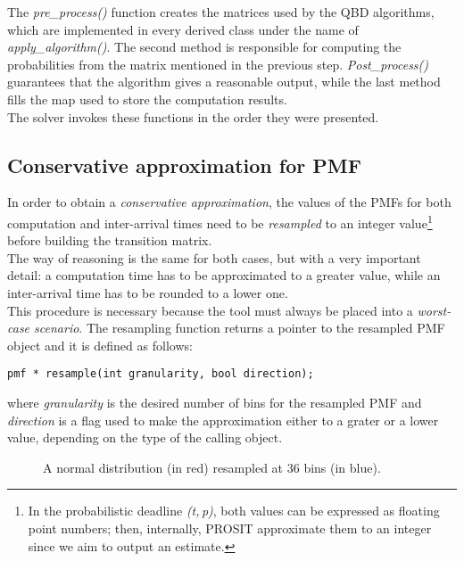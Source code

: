 The \emph{pre\_process()} function creates the matrices used by the QBD algorithms, which are implemented in every derived class under the name of \emph{apply\_algorithm()}. The second method is responsible for computing the probabilities from the matrix mentioned in the previous step. \emph{Post\_process()} guarantees that the algorithm gives a reasonable output, while the last method fills the map used to store the computation results.\\
The solver invokes these functions in the order they were presented.

\subsection{Conservative approximation for PMF}
In order to obtain a \emph{conservative approximation}, the values of the PMFs for both computation and inter-arrival times need to be \emph{resampled} to an integer value\footnote{In the probabilistic deadline \emph{(t,\,p)}, both values can be expressed as floating point numbers; then, internally, PROSIT approximate them to an integer since we aim to output an estimate.} before building the transition matrix.\\
The way of reasoning is the same for both cases, but with a very important detail: a computation time has to be approximated to a greater value, while an inter-arrival time has to be rounded to a lower one.\\ 
This procedure is necessary because the tool must always be placed into a \emph{worst-case scenario}. The resampling function returns a pointer to the resampled PMF object and it is defined as follows:
\begin{lstlisting}[frame=bt, numbers=none]
  pmf * resample(int granularity, bool direction);
\end{lstlisting}

where \emph{granularity} is the desired number of bins for the resampled PMF and \emph{direction} is a flag used to make the approximation either to a grater or a lower value, depending on the type of the calling object.\\
\begin{figure}[H]
  \caption{A normal distribution (in red) resampled at 36 bins (in blue).}
  \label{resample}
\end{figure}

